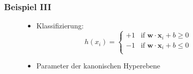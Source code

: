 \begin{frame}
    \frametitle{Beispiel III}

    \begin{figure}[h]
        \begin{minipage}{0.4\textwidth} 
        \end{minipage}
        \hfill
        \begin{minipage}{0.4\textwidth}
            \begin{itemize}
                \item<1-> Klassifizierung:
                    \begin{equation*}
                        h(x_i) = \begin{cases}
                            +1 & \text{if } \boldsymbol{w} \cdot \boldsymbol{x}_i + b \geq 0 \\
                            -1 & \text{if } \boldsymbol{w} \cdot \boldsymbol{x}_i + b \leq 0 \\
                        \end{cases}
                    \end{equation*}
                \item<1-> Parameter der kanonischen Hyperebene

\end{itemize}
\end{minipage}
\end{figure}
\end{frame}
